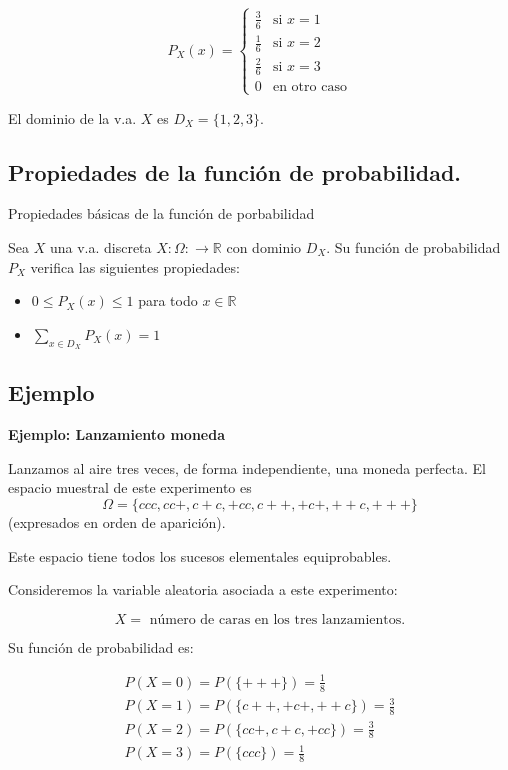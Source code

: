 \documentclass[]{book}
\providecommand{\tightlist}{%
  \setlength{\itemsep}{0pt}\setlength{\parskip}{0pt}}
\begin{document}
\[P_{X}(x)=\left\{\begin{array}{ll} \frac36 & \mbox{si } x=1\\
\frac16 & \mbox{si } x=2\\ \frac26 & \mbox{si } x=3\\ 0 & \mbox{en otro
caso}\end{array}\right.\]

El dominio de la v.a. \(X\) es \(D_X=\{1,2,3\}.\)

\hypertarget{propiedades-de-la-funciuxf3n-de-probabilidad.}{%
\subsection{Propiedades de la función de probabilidad.}\label{propiedades-de-la-funciuxf3n-de-probabilidad.}}

 Propiedades básicas de la función de porbabilidad

Sea \(X\) una v.a. discreta \(X:\Omega:\to\mathbb{R}\) con dominio \(D_X\). Su función de probabilidad \(P_{X}\) verifica las siguientes propiedades:

\begin{itemize}
\tightlist
\item
  \(0\leq P_{X}(x)\leq 1\) para todo \(x\in\mathbb{R}\)
\item
  \(\sum\limits_{x\in D_X} P_{X}(x)=1\)
\end{itemize}

\hypertarget{ejemplo-9}{%
\subsection{Ejemplo}\label{ejemplo-9}}

\textbf{Ejemplo: Lanzamiento moneda}

Lanzamos al aire tres veces, de forma independiente, una moneda perfecta. El espacio muestral de este experimento es
\[\Omega=\{ccc,cc+,c+c,+cc,c++,+c+,++c,+++\}\] (expresados en orden de aparición).

Este espacio tiene todos los sucesos elementales
equiprobables.

Consideremos la variable aleatoria asociada a este experimento:

\[X=\mbox{ número de caras en los tres lanzamientos}.\]

Su función de probabilidad es:

\[
\begin{array}{l}
P(X=0)=P(\{+++\})=\frac18\\ P(X=1)=P(\{c++,+c+,++c\})=\frac38\\
    P(X=2)=P(\{cc+,c+c,+cc\})=\frac38\\
    P(X=3)=P(\{ccc\})=\frac18
\end{array}
\]
\end{document}
